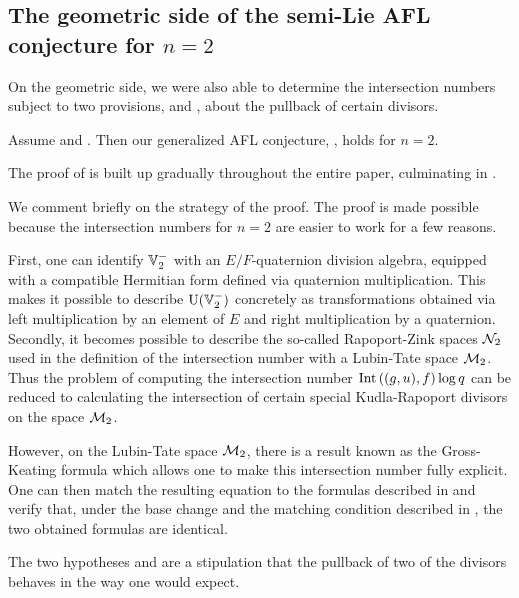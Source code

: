 \subsection{The geometric side of the semi-Lie AFL conjecture for $n=2$}
On the geometric side, we were also able to determine the intersection numbers
subject to two provisions,
 and ,
about the pullback of certain divisors.
\begin{theorem}
  [Semi-Lie AFL for $n=2$]
  \label{thm:semi_lie_n_equals_2}
  Assume  and .
  Then our generalized AFL conjecture, , holds for $n = 2$.
\end{theorem}
The proof of  is built up gradually
throughout the entire paper, culminating in .

We comment briefly on the strategy of the proof.
The proof is made possible because the intersection numbers for $n=2$
are easier to work for a few reasons.
\begin{itemize}
\ii First, one can identify $\mathbb V_2^-$ with an $E/F$-quaternion division algebra,
equipped with a compatible Hermitian form defined via quaternion multiplication.
This makes it possible to describe $\operatorname{U}(\mathbb V_2^-)$ concretely as transformations obtained
via left multiplication by an element of $E$ and right multiplication by a quaternion.
\ii Secondly, it becomes possible to describe the so-called Rapoport-Zink spaces $\mathcal N_2$
used in the definition of the intersection number with a Lubin-Tate space $\mathcal M_2$.
Thus the problem of computing the intersection number
$\operatorname{Int}\left( (g,u), f \right) \log q$
can be reduced to calculating the intersection of certain special
Kudla-Rapoport divisors on the space $\mathcal M_2$.

However, on the Lubin-Tate space $\mathcal M_2$,
there is a result known as the Gross-Keating formula \cite{ref:GK}
which allows one to make this intersection number fully explicit.
One can then match the resulting equation to the formulas described in
and verify that, under the base change 
and the matching condition described in ,
the two obtained formulas are identical.
\end{itemize}
The two hypotheses  and 
are a stipulation that the pullback of two of the divisors
behaves in the way one would expect.

